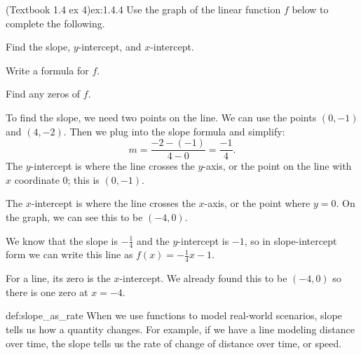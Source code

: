 \documentclass{article}
\begin{document}
\begin{example}{(Textbook 1.4 ex 4)}{ex:1.4.4}
    Use the graph of the linear function $f$ below to complete the following.
    \begin{problem}
        \item Find the slope, $y$-intercept, and $x$-intercept.
        \item Write a formula for $f$.
        \item Find any zeros of $f$.
    \end{problem}
    \begin{center}\end{center}
\end{example}
\begin{solution}
    \begin{problem}
        \item To find the slope, we need two points on the line. We can use the points $(0,-1)$ and $(4,-2)$. Then we plug into the slope formula and simplify:
        \[m = \frac{-2-(-1)}{4-0}=\frac{-1}{4}.\]
        The $y$-intercept is where the line crosses the $y$-axis, or the point on the line with $x$ coordinate 0; this is $(0,-1)$.

        The $x$-intercept is where the line crosses the $x$-axis, or the point where $y=0$. On the graph, we can see this to be $(-4,0)$.
        \item We know that the slope is $-\frac{1}{4}$ and the $y$-intercept is $-1$, so in slope-intercept form we can write this line as $f(x)=-\frac{1}{4}x-1$.
        \item For a line, its zero is the $x$-intercept. We already found this to be $(-4,0)$ so there is one zero at $x=-4$.
    \end{problem}
\end{solution}

\begin{definition}{}{def:slope_as_rate}
    When we use functions to model real-world scenarios, slope tells us how a quantity changes. For example, if we have a line modeling distance over time, the slope tells us the rate of change of distance over time, or speed.
\end{definition}
\end{document}
